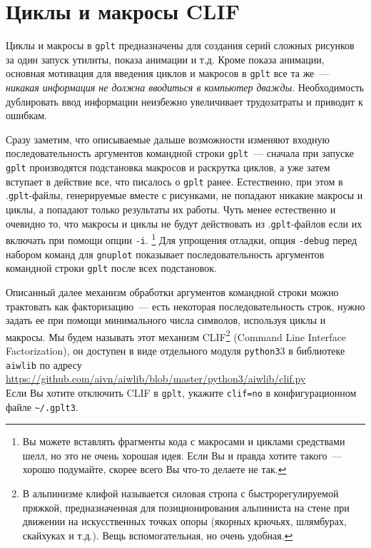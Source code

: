 \documentclass[12pt]{article}
\def\gplt{{\tt gplt}}
\def\gnuplot{{\tt gnuplot}}
\def\python{{\tt python3}}
\begin{document}
\section{Циклы и макросы CLIF}\label{clif:sec}
\begin{figure}
  \vphantom{.}
  \vspace{-3cm}

\end{figure}
Циклы и макросы в \gplt{} предназначены для создания серий сложных рисунков за один запуск утилиты, показа анимации и т.д.
Кроме показа анимации, основная мотивация для введения циклов и макросов в \gplt{} все та же~--- {\it никакая информация не должна вводиться в компьютер дважды}.
Необходимость дублировать ввод информации неизбежно увеличивает трудозатраты и приводит к ошибкам.

Сразу заметим, что описываемые дальше возможности
изменяют входную последовательность аргументов командной строки \gplt~--- сначала при запуске \gplt{} производятся подстановка макросов и
раскрутка циклов, а уже затем вступает в действие все, что писалось о \gplt{} ранее. Естественно, при этом
в .\gplt-файлы, генерируемые вместе с рисунками, не попадают никакие макросы и циклы, а попадают только результаты их работы.
Чуть менее естественно и очевидно то, что
макросы и циклы не будут действовать из .\gplt-файлов если их включать при помощи опции \verb'-i'.
\footnote{Вы можете вставлять фрагменты кода с макросами и циклами средствами шелл, но это не очень хорошая идея. Если Вы и правда хотите такого~---
хорошо подумайте, скорее всего Вы что-то делаете не так.}
Для упрощения отладки, опция \verb'-debug' перед набором команд для \gnuplot{} показывает
последовательность аргументов командной строки \gplt{} после всех подстановок.

Описанный далее механизм обработки аргументов командной строки можно трактовать как факторизацию~--- есть некоторая последовательность строк,
нужно задать ее при помощи минимального числа символов, используя циклы и макросы. Мы будем называть этот механизм
CLIF\footnote{В альпинизме клифой называется силовая стропа с быстрорегулируемой пряжкой, предназначенная для позиционирования
  альпиниста на стене при движении на искусственных точках опоры (якорных крючьях, шлямбурах, скайхуках и т.д.). Вещь вспомогательная,
  но очень удобная.}
(Command Line Interface Factorization), он доступен в виде отдельного модуля \python3{} в библиотеке \verb'aiwlib' по адресу\\
\url{https://github.com/aivn/aiwlib/blob/master/python3/aiwlib/clif.py}\\
Если Вы хотите отключить CLIF в \gplt, укажите \verb'clif=no' в конфигурационном файле \verb'~/.gplt3'.
\end{document}

